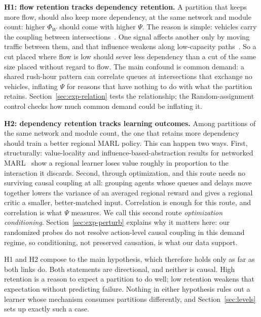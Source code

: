 \documentclass[journal]{IEEEtran}
\theoremstyle{definition}
\begin{document}
\noindent\textbf{H1: flow retention tracks dependency retention.}
A partition that keeps more flow, should also keep more dependency, at the same network and module count: higher $\Phi_W$ should come with higher $\Psi$. The reason is simple: vehicles carry the coupling between intersections~\citep{daganzo1994ctm,jin2012linkqueue}. One signal affects another only by moving traffic between them, and that influence weakens along low-capacity paths~\citep{polyanskiy2017sdpi,evans1999percolation}. So a cut placed where flow is low should sever less dependency than a cut of the same size placed without regard to flow. The main confound is common demand: a shared rush-hour pattern can correlate queues at intersections that exchange no vehicles, inflating $\Psi$ for reasons that have nothing to do with what the partition retains. Section~\ref{sec:exp-relation} tests the relationship; the Random-assignment control checks how much common demand could be inflating it.

\noindent\textbf{H2: dependency retention tracks learning outcomes.}
Among partitions of the same network and module count, the one that retains more dependency should train a better regional MARL policy. This can happen two ways. First, structurally: value-locality and influence-based-abstraction results for networked MARL~\citep{qu2020average,qu2022scalable,congeduti2021iba} show a regional learner loses value roughly in proportion to the interaction it discards. Second, through optimization, and this route needs no surviving causal coupling at all: grouping agents whose queues and delays move together lowers the variance of an averaged regional reward and gives a regional critic a smaller, better-matched input. Correlation is enough for this route, and correlation is what $\Psi$ measures. We call this second route \emph{optimization conditioning}. Section~\ref{sec:exp-perturb} explains why it matters here: our randomized probes do not resolve action-level causal coupling in this demand regime, so conditioning, not preserved causation, is what our data support.


H1 and H2 compose to the main hypothesis, which therefore holds only as far as both links do. Both statements are directional, and neither is causal. High retention is a reason to expect a partition to do well; low retention weakens that expectation without predicting failure. Nothing in either hypothesis rules out a learner whose mechanism consumes partitions differently, and Section~\ref{sec:levels} sets up exactly such a case.
\end{document}
